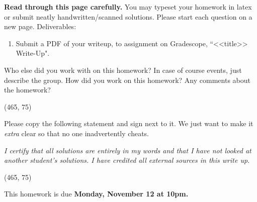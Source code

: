 \documentclass[preview]{standalone}
\begin{document}
\fontsize{12}{15}\selectfont


\textbf{Read through this page carefully.} You may typeset your homework in latex or submit neatly handwritten/scanned solutions. Please start each question on a new page. Deliverables:

\begin{enumerate}
  \item Submit a PDF of your writeup, 
  to assignment on Gradescope, ``<<title>> Write-Up". 
\end{enumerate}


\begin{Parts}

\Part Who else did you work with on this homework? In case of course events, just describe the group. How did you work on this homework? Any comments about the homework?

\vspace{15pt}
\framebox(465, 75){}

\Part Please copy the following statement and sign next to it. We just want to make it \textit{extra} clear so that no one inadvertently cheats.

\textit{I certify that all solutions are entirely in my words and that I have not looked at another student's solutions. I have credited all external sources in this write up.}

\vspace{15pt}
\framebox(465, 75){}

\end{Parts}

\pagebreak

This homework is due \textbf{Monday, November 12 at 10pm.}




\newcommand{\weight}{\mathbf{W}}
\newcommand{\weightprod}{\overline{\mathbf{W}}}
\end{document}
